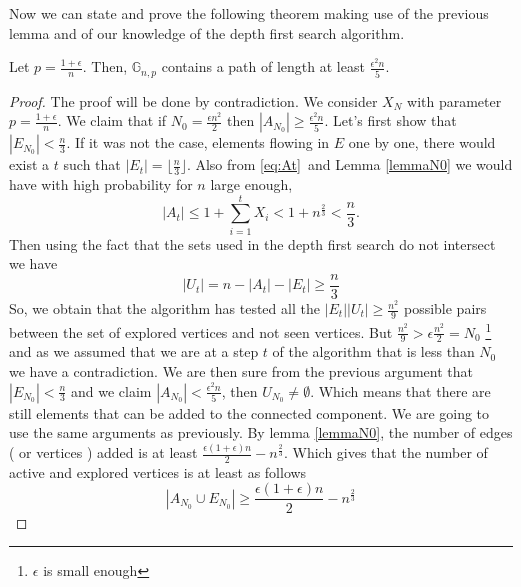 Now we can state and prove the following theorem making use of the previous lemma and of our knowledge of the depth first search algorithm.
\begin{theorem}
	Let $p = \frac{1+\epsilon}{n}$. Then, $\mathbb{G}_{n,p}$ contains a path of length at least $\frac{\epsilon^2n}{5}$.
\end{theorem}
\begin{proof}
	The proof will be done by contradiction.
	\newline
	We consider $X_N$ with parameter $p = \frac{1+\epsilon}{n}$. We claim that if $N_0 = \frac{\epsilon n^2}{2}$ then $|A_{N_0}| \geq \frac{\epsilon^2 n}{5}$.
	\newline
	Let's first show that $|E_{N_0}| < \frac{n}{3}$.
	\newline
	If it was not the case, elements flowing in $E$ one by one, there would exist a $t$ such that $|E_t| = \lfloor\frac{n}{3}\rfloor$. Also from \eqref{eq:At} and Lemma \ref{lemmaN0} we would have with high probability for $n$ large enough,
	\begin{equation}
		|A_t| \leq 1 + \sum_{i=1}^{t} X_i < 1 + n^{\frac{2}{3}} < \frac{n}{3}.
	\end{equation}
	Then using the fact that the sets used in the depth first search do not intersect we have
	\begin{equation}
		|U_t| = n - |A_t| - |E_t| \geq \frac{n}{3}
	\end{equation}
	So, we obtain that the algorithm has tested all the $|E_t||U_t| \geq \frac{n^2}{9}$ possible pairs between the set of explored vertices and not seen vertices.
	But $\frac{n^2}{9} > \epsilon\frac{n^2}{2} = N_0$ \footnote{ $\epsilon$ is small enough} and as we assumed that we are at a step $t$ of the algorithm that is less than $N_0$ we have a contradiction. 
	\newline
	We are then sure from the previous argument that $|E_{N_0}| < \frac{n}{3}$ and we claim $|A_{N_0}| < \frac{\epsilon^2 n}{5}$, then $U_{N_0} \neq \emptyset$. 
	Which means that there are still elements that can be added to the connected component.
	We are going to use the same arguments as previously.
	\newline
	By lemma \eqref{lemmaN0}, the number of edges ( or vertices ) added is at least $\frac{\epsilon(1+\epsilon)n}{2} - n^{\frac{2}{3}}$.
	Which gives that the number of active and explored vertices is at least as follows
	\begin{equation}
		|A_{N_0} \cup E_{N_0}| \geq \frac{\epsilon(1+\epsilon)n}{2} - n^{\frac{2}{3}}

\end{equation}
\end{proof}
